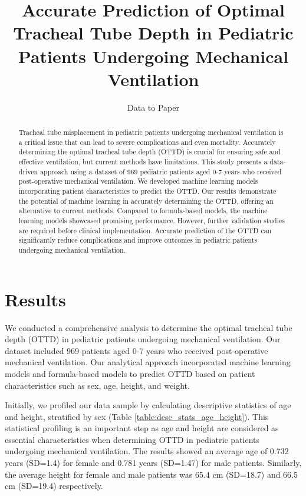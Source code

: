 \documentclass[11pt]{article}
\title{Accurate Prediction of Optimal Tracheal Tube Depth in Pediatric Patients Undergoing Mechanical Ventilation}
\author{Data to Paper}
\begin{document}
\maketitle
\begin{abstract}
Tracheal tube misplacement in pediatric patients undergoing mechanical ventilation is a critical issue that can lead to severe complications and even mortality. Accurately determining the optimal tracheal tube depth (OTTD) is crucial for ensuring safe and effective ventilation, but current methods have limitations. This study presents a data-driven approach using a dataset of 969 pediatric patients aged 0-7 years who received post-operative mechanical ventilation. We developed machine learning models incorporating patient characteristics to predict the OTTD. Our results demonstrate the potential of machine learning in accurately determining the OTTD, offering an alternative to current methods. Compared to formula-based models, the machine learning models showcased promising performance. However, further validation studies are required before clinical implementation. Accurate prediction of the OTTD can significantly reduce complications and improve outcomes in pediatric patients undergoing mechanical ventilation.
\end{abstract}
\section*{Results}

We conducted a comprehensive analysis to determine the optimal tracheal tube depth (OTTD) in pediatric patients undergoing mechanical ventilation. Our dataset included 969 patients aged 0-7 years who received post-operative mechanical ventilation. Our analytical approach incorporated machine learning models and formula-based models to predict OTTD based on patient characteristics such as sex, age, height, and weight. 

Initially, we profiled our data sample by calculating descriptive statistics of age and height, stratified by sex (Table {}\ref{table:desc_stats_age_height}). This statistical profiling is an important step as age and height are considered as essential characteristics when determining OTTD in pediatric patients undergoing mechanical ventilation. The results showed an average age of 0.732 years (SD=1.4) for female and 0.781 years (SD=1.47) for male patients. Similarly, the average height for female and male patients was 65.4 cm (SD=18.7) and 66.5 cm (SD=19.4) respectively.
\end{document}
